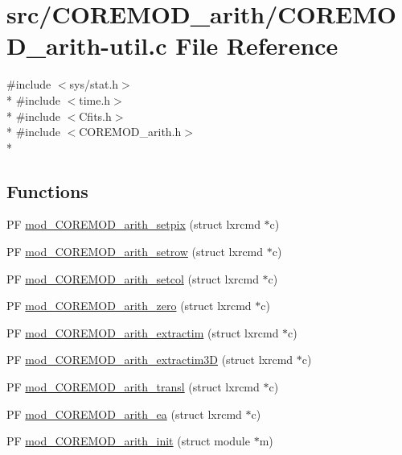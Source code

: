 \hypertarget{src_2COREMOD__arith_2COREMOD__arith-util_8c}{\section{src/\+C\+O\+R\+E\+M\+O\+D\+\_\+arith/\+C\+O\+R\+E\+M\+O\+D\+\_\+arith-\/util.c File Reference}
\label{src_2COREMOD__arith_2COREMOD__arith-util_8c}
}
{\ttfamily \#include $<$sys/stat.\+h$>$}\\*
{\ttfamily \#include $<$time.\+h$>$}\\*
{\ttfamily \#include $<$Cfits.\+h$>$}\\*
{\ttfamily \#include $<$C\+O\+R\+E\+M\+O\+D\+\_\+arith.\+h$>$}\\*
\subsection*{Functions}
\begin{DoxyCompactItemize}
\item 
P\+F \hyperlink{src_2COREMOD__arith_2COREMOD__arith-util_8c_a620380159486515a9dca2152af7454d3}{mod\+\_\+\+C\+O\+R\+E\+M\+O\+D\+\_\+arith\+\_\+setpix} (struct lxrcmd $\ast$c)
\item 
P\+F \hyperlink{src_2COREMOD__arith_2COREMOD__arith-util_8c_aeb885e652380aa903a6e8616f49fa72b}{mod\+\_\+\+C\+O\+R\+E\+M\+O\+D\+\_\+arith\+\_\+setrow} (struct lxrcmd $\ast$c)
\item 
P\+F \hyperlink{src_2COREMOD__arith_2COREMOD__arith-util_8c_a3c3e340b012e1cf8ba8cfb44a66b5ccc}{mod\+\_\+\+C\+O\+R\+E\+M\+O\+D\+\_\+arith\+\_\+setcol} (struct lxrcmd $\ast$c)
\item 
P\+F \hyperlink{src_2COREMOD__arith_2COREMOD__arith-util_8c_a81af934722c893a224dcfa7842c6c318}{mod\+\_\+\+C\+O\+R\+E\+M\+O\+D\+\_\+arith\+\_\+zero} (struct lxrcmd $\ast$c)
\item 
P\+F \hyperlink{src_2COREMOD__arith_2COREMOD__arith-util_8c_a95b0d0150c59d81453d16eb3e7077dfd}{mod\+\_\+\+C\+O\+R\+E\+M\+O\+D\+\_\+arith\+\_\+extractim} (struct lxrcmd $\ast$c)
\item 
P\+F \hyperlink{src_2COREMOD__arith_2COREMOD__arith-util_8c_a93d5a0872c60ae3979f40eff64fc74b7}{mod\+\_\+\+C\+O\+R\+E\+M\+O\+D\+\_\+arith\+\_\+extractim3\+D} (struct lxrcmd $\ast$c)
\item 
P\+F \hyperlink{src_2COREMOD__arith_2COREMOD__arith-util_8c_afd1b0b14e6fb6a813244270a1dd4e3c3}{mod\+\_\+\+C\+O\+R\+E\+M\+O\+D\+\_\+arith\+\_\+transl} (struct lxrcmd $\ast$c)
\item 
P\+F \hyperlink{src_2COREMOD__arith_2COREMOD__arith-util_8c_a178389ee1bb679a23f3be9e935664e67}{mod\+\_\+\+C\+O\+R\+E\+M\+O\+D\+\_\+arith\+\_\+ea} (struct lxrcmd $\ast$c)
\item 
P\+F \hyperlink{src_2COREMOD__arith_2COREMOD__arith-util_8c_a71c6f02204c17f2a98eb151b35c642aa}{mod\+\_\+\+C\+O\+R\+E\+M\+O\+D\+\_\+arith\+\_\+init} (struct module $\ast$m)
\end{DoxyCompactItemize}

